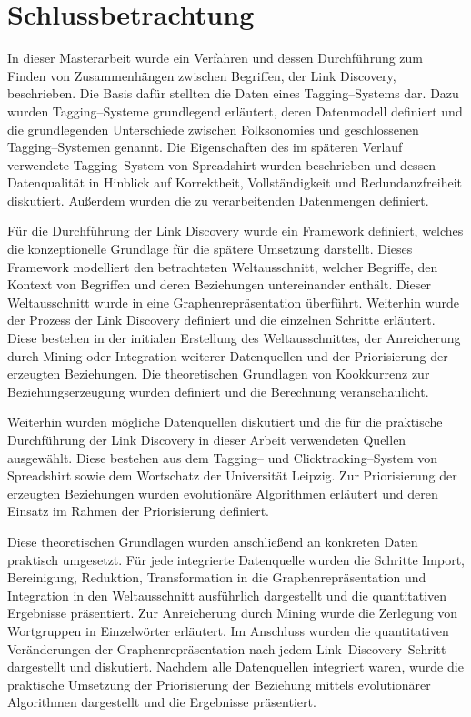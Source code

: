 \chapter{Schlussbetrachtung}
\label{summary}

In dieser Masterarbeit wurde ein Verfahren und dessen Durchführung zum Finden von Zusammenhängen zwischen Begriffen, der Link Discovery, beschrieben. Die Basis dafür stellten die Daten eines Tagging--Systems dar. Dazu wurden Tagging--Systeme grundlegend erläutert, deren Datenmodell definiert und die grundlegenden Unterschiede zwischen Folksonomies und geschlossenen Tagging--Systemen genannt. Die Eigenschaften des im späteren Verlauf verwendete Tagging--System von Spreadshirt wurden beschrieben und dessen Datenqualität in Hinblick auf Korrektheit, Vollständigkeit und Redundanzfreiheit diskutiert. Außerdem wurden die zu verarbeitenden Datenmengen definiert.

Für die Durchführung der Link Discovery wurde ein Framework definiert, welches die konzeptionelle Grundlage für die spätere Umsetzung darstellt. Dieses Framework modelliert den betrachteten Weltausschnitt, welcher Begriffe, den Kontext von Begriffen und deren Beziehungen untereinander enthält. Dieser Weltausschnitt wurde in eine Graphenrepräsentation überführt. Weiterhin wurde der Prozess der Link Discovery definiert und die einzelnen Schritte erläutert. Diese bestehen in der initialen Erstellung des Weltausschnittes, der Anreicherung durch Mining oder Integration weiterer Datenquellen und der Priorisierung der erzeugten Beziehungen. Die theoretischen Grundlagen von Kookkurrenz zur Beziehungserzeugung wurden definiert und die Berechnung veranschaulicht.

Weiterhin wurden mögliche Datenquellen diskutiert und die für die praktische Durchführung der Link Discovery in dieser Arbeit verwendeten Quellen ausgewählt. Diese bestehen aus dem Tagging-- und Clicktracking--System von Spreadshirt sowie dem Wortschatz der Universität Leipzig. Zur Priorisierung der erzeugten Beziehungen wurden evolutionäre Algorithmen erläutert und deren Einsatz im Rahmen der Priorisierung definiert.

Diese theoretischen Grundlagen wurden anschließend an konkreten Daten praktisch umgesetzt. Für jede integrierte Datenquelle wurden die Schritte Import, Bereinigung, Reduktion, Transformation in die Graphenrepräsentation und Integration in den Weltausschnitt ausführlich dargestellt und die quantitativen Ergebnisse präsentiert. Zur Anreicherung durch Mining wurde die Zerlegung von Wortgruppen in Einzelwörter erläutert. Im Anschluss wurden die quantitativen Veränderungen der Graphenrepräsentation nach jedem Link--Discovery--Schritt dargestellt und diskutiert. Nachdem alle Datenquellen integriert waren, wurde die praktische Umsetzung der Priorisierung der Beziehung mittels evolutionärer Algorithmen dargestellt und die Ergebnisse präsentiert.

